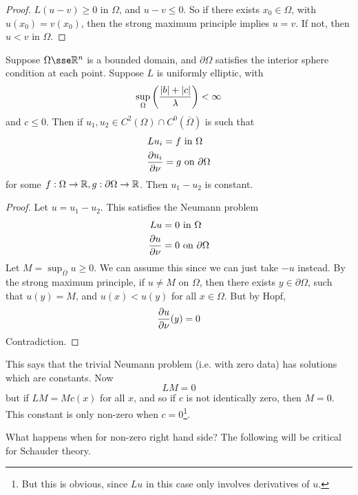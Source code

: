 \documentclass{article}
\begin{document}
\begin{proof}
    \(L(u - v) \ge 0\) in \(\Omega\), and \(u - v \le 0\). So if there exists \(x_0 \in \Omega\), with \(u(x_0) = v(x_0)\), then the strong maximum principle implies \(u = v\). If not, then \(u < v\) in \(\Omega\).
\end{proof}

\begin{corollary}
     Suppose \(\Omega \sse \R^n\) is a bounded domain, and \(\partial\Omega\) satisfies the interior sphere condition at each point. Suppose \(L\) is uniformly elliptic, with
    \[\sup_{\Omega}\left(\frac{\abs{b} + \abs{c}}{\lambda}\right) < \infty\]
    and \(c \le 0\). Then if \(u_1, u_2 \in C^2(\Omega) \cap C^0(\overline\Omega)\) is such that
    \begin{align*}
        Lu_i = f &\text{ in }\Omega \\
        \pdv{u_i}{\nu} = g &\text{ on }\partial\Omega
    \end{align*}
    for some \(f : \Omega \to \mathbb{R}, g : \partial\Omega \to \mathbb{R}\). Then \(u_1 - u_2\) is constant.
\end{corollary}

\begin{proof}
    Let \(u = u_1 - u_2\). This satisfies the Neumann problem
    \begin{align*}
        Lu = 0 &\text{ in }\Omega \\
        \pdv{u}{\nu} = 0 &\text{ on }\partial\Omega
    \end{align*}
    Let \(M = \sup_{\overline\Omega} u \ge 0\). We can assume this since we can just take \(-u\) instead. By the strong maximum principle, if \(u \ne M\) on \(\Omega\), then there exists \(y \in \partial\Omega\), such that \(u(y) = M\), and \(u(x) < u(y)\) for all \(x \in \Omega\). But by Hopf,
    \[{\pdv{u}{\nu}}(y) = 0\]
    Contradiction.
\end{proof}

\begin{remark}
    This says that the trivial Neumann problem (i.e. with zero data) has solutions which are constants. Now
    \[LM = 0\]
    but if \(LM = M c(x)\) for all \(x\), and so if \(c\) is not identically zero, then \(M = 0\). This constant is only non-zero when \(c = 0\)\footnote{But this is obvious, since \(Lu\) in this case only involves derivatives of \(u\).}.
\end{remark}

What happens when for non-zero right hand side? The following will be critical for Schauder theory.
\end{document}

